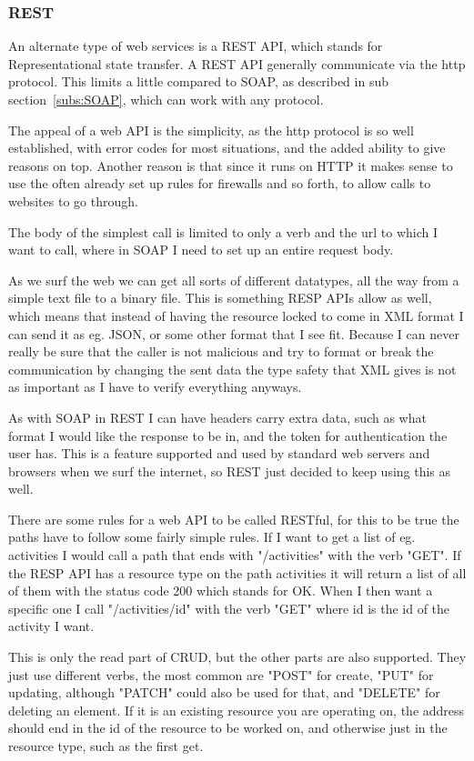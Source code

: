 \subsubsection{REST}
\label{subs:REST}
An alternate type of web services is a REST API, which stands for Representational state transfer. A REST API generally communicate via the http protocol. This limits a little compared to SOAP, as described in sub section~\ref{subs:SOAP}, which can work with any protocol.

The appeal of a web API is the simplicity, as the http protocol is so well established, with error codes for most situations, and the added ability to give reasons on top. Another reason is that since it runs on HTTP it makes sense to use the often already set up rules for firewalls and so forth, to allow calls to websites to go through.

The body of the simplest call is limited to only a verb and the url to which I want to call, where in SOAP I need to set up an entire request body.

As we surf the web we can get all sorts of different datatypes, all the way from a simple text file to a binary file. This is something RESP APIs allow as well, which means that instead of having the resource locked to come in XML format I can send it as eg. JSON, or some other format that I see fit\cite{rest:basic}. Because I can never really be sure that the caller is not malicious and try to format or break the communication by changing the sent data the type safety that XML gives is not as important as I have to verify everything anyways.

As with SOAP in REST I can have headers carry extra data, such as what format I would like the response to be in, and the token for authentication the user has. This is a feature supported and used by standard web servers and browsers when we surf the internet, so REST just decided to keep using this as well.

There are some rules for a web API to be called RESTful\cite{rest:msdn}, for this to be true the paths have to follow some fairly simple rules. If I want to get a list of eg. activities I would call a path that ends with "/activities" with the verb "GET". If the RESP API has a resource type on the path activities it will return a list of all of them with the status code 200 which stands for OK. When I then want a specific one I call "/activities/id" with the verb "GET" where id is the id of the activity I want.

This is only the read part of CRUD, but the other parts are also supported. They just use different verbs, the most common are "POST" for create, "PUT" for updating, although "PATCH" could also be used for that, and "DELETE" for deleting an element. If it is an existing resource you are operating on, the address should end in the id of the resource to be worked on, and otherwise just in the resource type, such as the first get.

